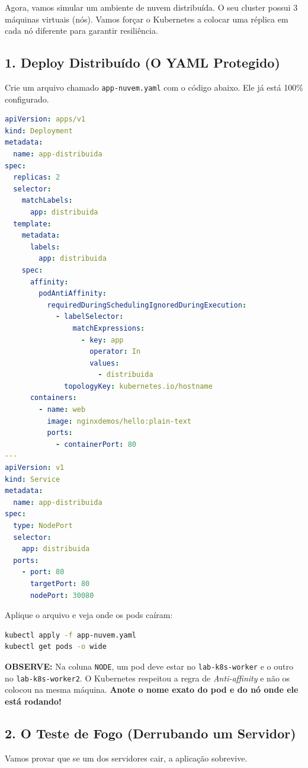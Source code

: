 \documentclass[11pt, a4paper]{article}
\begin{document}
Agora, vamos simular um ambiente de nuvem distribuída. O seu cluster possui 3 máquinas virtuais (nós). Vamos forçar o Kubernetes a colocar uma réplica em cada nó diferente para garantir resiliência.

\subsection*{1. Deploy Distribuído (O YAML Protegido)}
Crie um arquivo chamado \texttt{app-nuvem.yaml} com o código abaixo. Ele já está 100\% configurado.

\begin{lstlisting}[language=yaml]
apiVersion: apps/v1
kind: Deployment
metadata:
  name: app-distribuida
spec:
  replicas: 2
  selector:
    matchLabels:
      app: distribuida
  template:
    metadata:
      labels:
        app: distribuida
    spec:
      affinity:
        podAntiAffinity:
          requiredDuringSchedulingIgnoredDuringExecution:
            - labelSelector:
                matchExpressions:
                  - key: app
                    operator: In
                    values:
                      - distribuida
              topologyKey: kubernetes.io/hostname
      containers:
        - name: web
          image: nginxdemos/hello:plain-text
          ports:
            - containerPort: 80
---
apiVersion: v1
kind: Service
metadata:
  name: app-distribuida
spec:
  type: NodePort
  selector:
    app: distribuida
  ports:
    - port: 80
      targetPort: 80
      nodePort: 30080
\end{lstlisting}

Aplique o arquivo e veja onde os pods caíram:

\begin{lstlisting}[language=bash]
kubectl apply -f app-nuvem.yaml
kubectl get pods -o wide
\end{lstlisting}

\begin{tcolorbox}[colback=infobg, colframe=infoframe, arc=3pt, boxrule=0.8pt]
\textbf{OBSERVE:} Na coluna \texttt{NODE}, um pod deve estar no \texttt{lab-k8s-worker} e o outro no \texttt{lab-k8s-worker2}. O Kubernetes respeitou a regra de \textit{Anti-affinity} e não os colocou na mesma máquina. \textbf{Anote o nome exato do pod e do nó onde ele está rodando!}
\end{tcolorbox}

\subsection*{2. O Teste de Fogo (Derrubando um Servidor)}
Vamos provar que se um dos servidores cair, a aplicação sobrevive.
\end{document}
